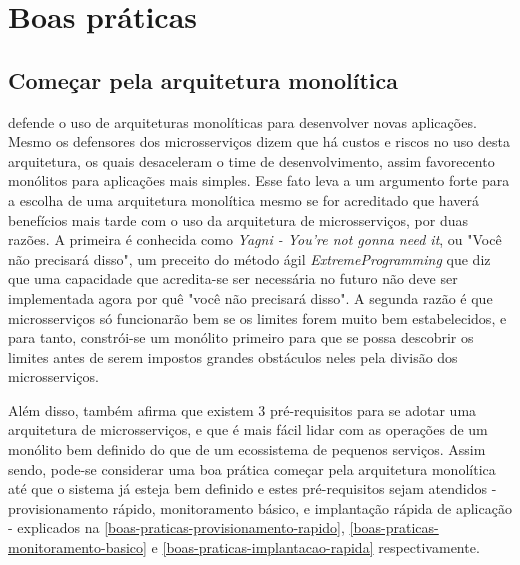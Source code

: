 \chapter{Boas práticas}\label{chapter-boas-praticas}


\section{Começar pela arquitetura monolítica}


 defende o uso de arquiteturas monolíticas para desenvolver novas aplicações. Mesmo os defensores dos microsserviços dizem que há custos e riscos no uso desta arquitetura, os quais desaceleram o time de desenvolvimento, assim favorecento monólitos para aplicações mais simples. Esse fato leva a um argumento forte para a escolha de uma arquitetura monolítica mesmo se for acreditado que haverá benefícios mais tarde com o uso da arquitetura de microsserviços, por duas razões. A primeira é conhecida como \emph{Yagni - You're not gonna need it}, ou "Você não precisará disso", um preceito do método ágil \emph{ExtremeProgramming} que diz que uma capacidade que acredita-se ser necessária no futuro não deve ser implementada agora por quê "você não precisará disso". A segunda razão é que microsserviços só funcionarão bem se os limites forem muito bem estabelecidos, e para tanto, constrói-se um monólito primeiro para que se possa descobrir os limites antes de serem impostos grandes obstáculos neles pela divisão dos microsserviços. \cite{martin-fowler-monolith-first}

Além disso,  também afirma que existem 3 pré-requisitos para se adotar uma arquitetura de microsserviços, e que é mais fácil lidar com as operações de um monólito bem definido do que de um ecossistema de pequenos serviços. Assim sendo, pode-se considerar uma boa prática começar pela arquitetura monolítica até que o sistema já esteja bem definido e estes pré-requisitos sejam atendidos - provisionamento rápido, monitoramento básico, e implantação rápida de aplicação - explicados na \autoref{boas-praticas-provisionamento-rapido}, \autoref{boas-praticas-monitoramento-basico} e \autoref{boas-praticas-implantacao-rapida} respectivamente. \cite{MartinFowlerMicroservicesPrereq}

